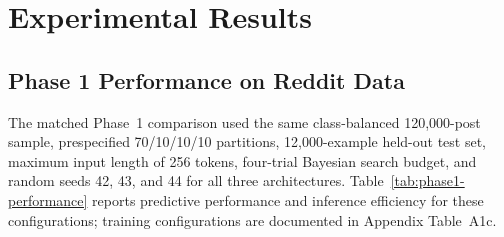 \documentclass{ieeeaccess}
\begin{document}
\section{Experimental Results}

\subsection{Phase 1 Performance on Reddit Data}

The matched Phase~1 comparison used the same class-balanced 120,000-post sample, prespecified 70/10/10/10 partitions, 12,000-example held-out test set, maximum input length of 256 tokens, four-trial Bayesian search budget, and random seeds 42, 43, and 44 for all three architectures. Table~\ref{tab:phase1-performance} reports predictive performance and inference efficiency for these configurations; training configurations are documented in Appendix Table~A1c.
\end{document}
